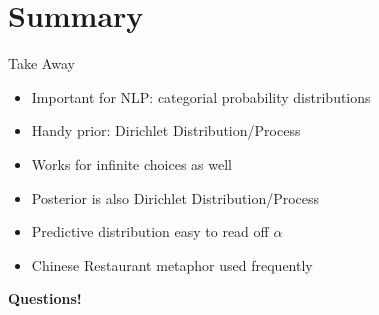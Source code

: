 \documentclass[11pt]{beamer}
\begin{document}
	\section{Summary}
	
	\begin{frame}{Take Away}
		\begin{itemize}
			\item Important for NLP: categorial probability distributions
			\item Handy prior: Dirichlet Distribution/Process
			\item Works for infinite choices as well
			\item Posterior is also Dirichlet Distribution/Process
			\item Predictive distribution easy to read off $\alpha$
			\item Chinese Restaurant metaphor used frequently
		\end{itemize}
	\end{frame}
	
	\begin{frame}
		\centering
		\begin{Large}
			\textbf{Questions!}
		\end{Large}
	\end{frame}
	
\end{document}
